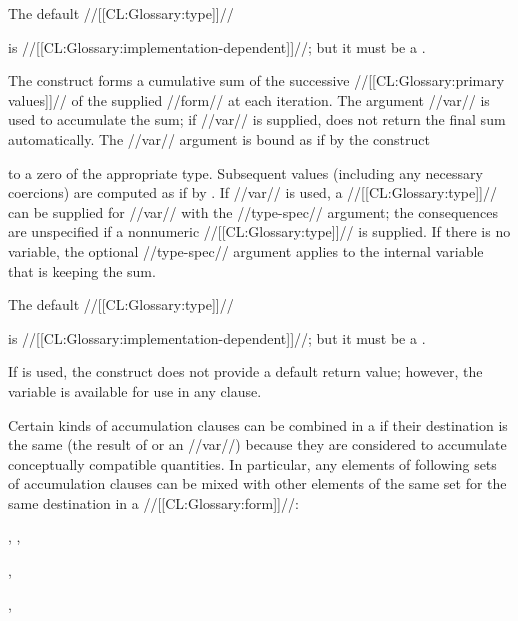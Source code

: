 The default //[[CL:Glossary:type]]// 

is //[[CL:Glossary:implementation-dependent]]//; but it
must be a .
 
The  construct forms a cumulative sum 
of the successive //[[CL:Glossary:primary values]]// of the supplied //form//
at each iteration.
The argument //var// is used to accumulate the sum;
if //var// is supplied,
 does not return the final sum automatically.
The //var// argument is bound as if by the construct 

to a zero of the appropriate type.
Subsequent values (including any necessary coercions) are computed as if by \thefunction{+}.
If  //var// is used,
a //[[CL:Glossary:type]]// can be supplied for //var// with the //type-spec// argument;
the consequences are unspecified if a nonnumeric //[[CL:Glossary:type]]// is supplied.           
If there is no  variable,
the optional //type-spec// argument applies to the internal variable
that is keeping the sum.

The default //[[CL:Glossary:type]]//

is //[[CL:Glossary:implementation-dependent]]//; but it
must be a .
 





If  is used,
the construct does not provide a default return value;
however, the variable is available
for use in any  clause.  
     


 










Certain kinds of accumulation clauses can be combined in a  
if their destination is the same 
(the result of  or an  //var//) 
because they are considered to accumulate conceptually compatible quantities.
In particular, 
any elements of following sets of accumulation clauses can be mixed
with other elements of the same set for the same destination 
in a  //[[CL:Glossary:form]]//:

\beginlist
\itemitem{\bull} , , 

\itemitem{\bull} , 

\itemitem{\bull} , 
\endlist


